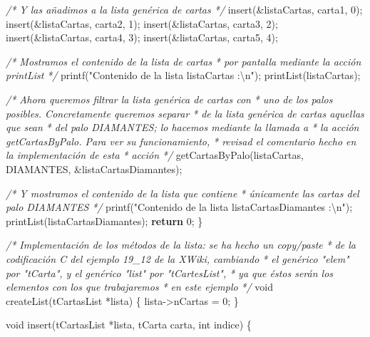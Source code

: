 \documentclass[
]{book}
\newenvironment{Shaded}{\begin{snugshade}}{\end{snugshade}}
\newcommand{\CommentTok}[1]{\textcolor[rgb]{0.56,0.35,0.01}{\textit{#1}}}
\newcommand{\ControlFlowTok}[1]{\textcolor[rgb]{0.13,0.29,0.53}{\textbf{#1}}}
\newcommand{\DataTypeTok}[1]{\textcolor[rgb]{0.13,0.29,0.53}{#1}}
\newcommand{\DecValTok}[1]{\textcolor[rgb]{0.00,0.00,0.81}{#1}}
\newcommand{\NormalTok}[1]{#1}
\newcommand{\SpecialCharTok}[1]{\textcolor[rgb]{0.00,0.00,0.00}{#1}}
\newcommand{\StringTok}[1]{\textcolor[rgb]{0.31,0.60,0.02}{#1}}
\begin{document}
\begin{Shaded}
\begin{Highlighting}[]
    \CommentTok{/* Y las añadimos a la lista genérica de cartas */}
\NormalTok{    insert(\&listaCartas, carta1, }\DecValTok{0}\NormalTok{);}
\NormalTok{    insert(\&listaCartas, carta2, }\DecValTok{1}\NormalTok{);}
\NormalTok{    insert(\&listaCartas, carta3, }\DecValTok{2}\NormalTok{);}
\NormalTok{    insert(\&listaCartas, carta4, }\DecValTok{3}\NormalTok{);}
\NormalTok{    insert(\&listaCartas, carta5, }\DecValTok{4}\NormalTok{);}

    \CommentTok{/* Mostramos el contenido de la lista de cartas}
\CommentTok{     * por pantalla mediante la acción printList }
\CommentTok{     */}
\NormalTok{    printf(}\StringTok{"Contenido de la lista \textquotesingle{}listaCartas\textquotesingle{} :}\SpecialCharTok{\textbackslash{}n}\StringTok{"}\NormalTok{);}
\NormalTok{    printList(listaCartas);}

    \CommentTok{/* Ahora queremos filtrar la lista genérica de cartas con}
\CommentTok{     * uno de los palos posibles. Concretamente queremos separar}
\CommentTok{     * de la lista genérica de cartas aquellas que sean}
\CommentTok{     * del palo DIAMANTES; lo hacemos mediante la llamada a}
\CommentTok{     * la acción getCartasByPalo. Para ver su funcionamiento,}
\CommentTok{     * revisad el comentario hecho en la implementación de esta}
\CommentTok{     * acción}
\CommentTok{     */}
\NormalTok{    getCartasByPalo(listaCartas, DIAMANTES, \&listaCartasDiamantes);}

    \CommentTok{/* Y mostramos el contenido de la lista que contiene}
\CommentTok{     * únicamente las cartas del palo DIAMANTES }
\CommentTok{     */}
\NormalTok{    printf(}\StringTok{"Contenido de la lista \textquotesingle{}listaCartasDiamantes\textquotesingle{} :}\SpecialCharTok{\textbackslash{}n}\StringTok{"}\NormalTok{);}
\NormalTok{    printList(listaCartasDiamantes);}
    \ControlFlowTok{return} \DecValTok{0}\NormalTok{;}
\NormalTok{\}}

\CommentTok{/* Implementación de los métodos de la lista: se ha hecho un copy/paste}
\CommentTok{ * de la codificación C del ejemplo 19\_12 de la XWiki, cambiando}
\CommentTok{ * el genérico "elem" por "tCarta", y el genérico "list" por "tCartesList",}
\CommentTok{ * ya que éstos serán los elementos con los que trabajaremos}
\CommentTok{ * en este ejemplo}
\CommentTok{ */}
\DataTypeTok{void}\NormalTok{ createList(tCartasList *lista) \{}
\NormalTok{    lista{-}\textgreater{}nCartas = }\DecValTok{0}\NormalTok{;}
\NormalTok{\}}

\DataTypeTok{void}\NormalTok{ insert(tCartasList *lista, tCarta carta, }\DataTypeTok{int}\NormalTok{ indice) \{}


\end{Highlighting}
\end{Shaded}
\end{document}

